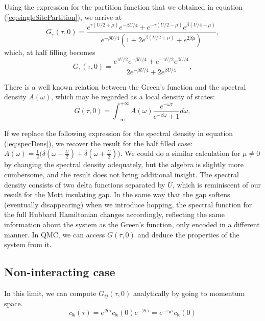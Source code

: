 Using the expression for the partition function that we obtained in equation (\ref{eq:singleSitePartition}), we arrive at
\begin{equation}
G_\uparrow (\tau, 0) = \frac{ e^{\tau ( U / 2 + \mu )} e^{-\beta U / 4} + e^{-\tau ( U / 2 - \mu )} e^{\beta (U / 4 + \mu)} }{ e^{-\beta U / 4} ( 1 + 2 e^{\beta ( U /2 + \mu)} + e^{2\beta \mu} ) } ,
\end{equation}
which, at half filling becomes
\begin{equation}
G_\uparrow (\tau, 0) = \frac{ e^{\tau U / 2} e^{-\beta U / 4} + e^{-\tau U / 2} e^{\beta U / 4 } }{ 2 e^{-\beta U / 4}  + 2 e^{\beta U / 4} } ,
\end{equation}

There is a well known relation between the Green's function and the spectral density $A ( \omega )$, which may be regarded as a local density of states:
\begin{equation}\label{eq:specDens}
G ( \tau, 0 ) =  \int_{-\infty}^{+\infty} A ( \omega ) \frac{e^{-\omega \tau} }{ e^{-\beta \omega} + 1 } d\omega ,
\end{equation}

If we replace the following expression for the spectral density in equation (\ref{eq:specDens}), we recover the result for the half filled case: $
A ( \omega ) = \frac{1}{2} \bigg( \delta ( \omega - \frac{U}{2} ) + \delta ( \omega + \frac{U}{2} ) \bigg)
$.
We could do a similar calculation for $\mu \neq 0$ by changing the spectral density adequately, but the algebra is slightly more cumbersome, and the result does not bring additional insight.
The spectral density consists of two delta functions separated by $U$, which is reminiscent of our result for the Mott insulating gap.
In the same way that the gap softens (eventually disappearing) when we introduce hopping, the spectral function for the full Hubbard Hamiltonian changes accordingly, reflecting the same information about the system as the Green's function, only encoded in a different manner.
In \acs{QMC}, we can access $G(\tau, 0)$ and deduce the properties of the system from it.

\subsection{Non-interacting case}

In this limit, we can compute $G_{i j} ( \tau, 0 )$ analytically by going to momentum space.
\begin{equation}
c_{\bm k} ( \tau ) = e^{ \mathcal{H} \tau } c_{\bm k} ( 0 ) e^{-\mathcal{H} \tau } = e^{-\varepsilon_{\bm k} \tau } c_{\bm k} ( 0 )
\end{equation}


